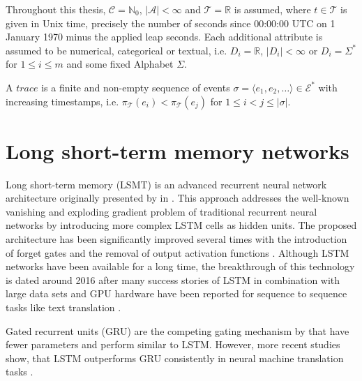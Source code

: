 Throughout this thesis,  $\mathcal{C} = \mathbb{N}_0$, $|\mathcal{A}| < \infty$ and $ \mathcal{T} = \mathbb{R}$ is assumed, where $t \in \mathcal{T}$ is given in Unix time, precisely the number of seconds since 00:00:00 UTC on 1 January 1970 minus the applied leap seconds.
Each additional attribute is assumed to be numerical, categorical or textual, i.e. $D_i = \mathbb{R}$, $|D_i| < \infty$ or $D_i = \Sigma^\ast$  for $1 \leq i \leq m$ and some fixed Alphabet $\Sigma$.

\begin{definition}
	A $trace$ is a finite and non-empty sequence of events $\sigma = \langle e_1, e_2, \dots\rangle \in  \mathcal{E}^\ast$ with increasing timestamps, i.e. $\pi_\mathcal{T} (e_i) < \pi_\mathcal{T} (e_j) $ for $1 \leq i < j \leq |\sigma|$.
\end{definition}




\section{Long short-term memory networks}

Long short-term memory (LSMT) is an advanced recurrent neural network architecture originally presented by \citeauthor{DBLP:journals/neco/HochreiterS97} in \citeyear{DBLP:journals/neco/HochreiterS97}  \cite{DBLP:journals/neco/HochreiterS97}.
This approach addresses the well-known vanishing and exploding gradient problem \cite{DBLP:conf/icml/PascanuMB13}  of traditional recurrent neural networks by introducing more complex LSTM cells as hidden units.
The proposed architecture has been significantly improved several times with the introduction of forget gates \cite{DBLP:journals/neco/GersSC00} and the removal of output activation functions \cite {DBLP:journals/tnn/GreffSKSS17}.
Although LSTM networks have been available for a long time, the breakthrough of this technology is dated around 2016 after many success stories of LSTM in combination with large data sets and GPU hardware have been reported for sequence to sequence tasks like text translation \cite{DBLP:journals/corr/WuSCLNMKCGMKSJL16}.


Gated recurrent units (GRU) \cite{DBLP:conf/emnlp/ChoMGBBSB14} are the competing gating mechanism by \citeauthor{DBLP:conf/emnlp/ChoMGBBSB14} that have fewer parameters and perform similar to LSTM.
However, more recent studies show, that LSTM outperforms GRU consistently in neural machine translation tasks \cite{DBLP:journals/corr/BritzGLL17}.

